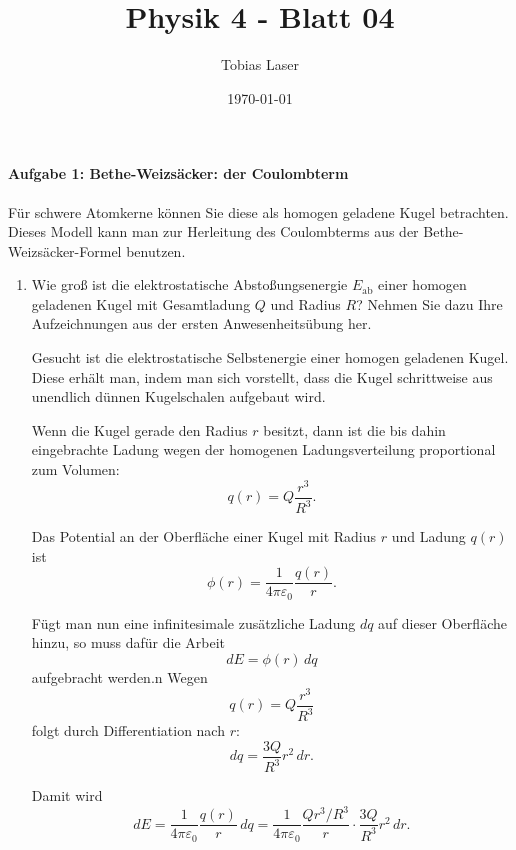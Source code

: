 \documentclass[11pt,a4paper]{scrartcl}
\begin{document}
\title{Physik 4 - Blatt 04}
\author{Tobias Laser}
\date{\today}
\maketitle
\vfill
\thispagestyle{empty}


\paragraph{Aufgabe 1: Bethe-Weizsäcker: der Coulombterm}

Für schwere Atomkerne können Sie diese als homogen geladene Kugel betrachten.
Dieses Modell kann man zur Herleitung des Coulombterms aus der Bethe-Weizsäcker-Formel benutzen.

\begin{enumerate}[label=(\alph*)]

    \item Wie groß ist die elektrostatische Abstoßungsenergie $E_{\mathrm{ab}}$ einer homogen geladenen Kugel mit Gesamtladung $Q$ und Radius $R$? Nehmen Sie dazu Ihre Aufzeichnungen aus der ersten Anwesenheitsübung her.

    \begin{solutionbox}
        Gesucht ist die elektrostatische Selbstenergie einer homogen geladenen Kugel.
        Diese erhält man, indem man sich vorstellt, dass die Kugel schrittweise aus unendlich dünnen Kugelschalen aufgebaut wird.

        Wenn die Kugel gerade den Radius $r$ besitzt, dann ist die bis dahin eingebrachte Ladung wegen der homogenen Ladungsverteilung proportional zum Volumen:
        \[
            q(r)=Q\frac{r^3}{R^3}.
        \]

        Das Potential an der Oberfläche einer Kugel mit Radius $r$ und Ladung $q(r)$ ist
        \[
            \phi(r)=\frac{1}{4\pi\varepsilon_0}\frac{q(r)}{r}.
        \]

        Fügt man nun eine infinitesimale zusätzliche Ladung $dq$ auf dieser Oberfläche hinzu, so muss dafür die Arbeit
        \[
            dE=\phi(r)\,dq 
        \]
        aufgebracht werden.n
        Wegen
        \[
            q(r)=Q\frac{r^3}{R^3}
        \]
        folgt durch Differentiation nach $r$:
        \[
            dq=\frac{3Q}{R^3}r^2\,dr.
        \]

        Damit wird
        \[
            dE
            =\frac{1}{4\pi\varepsilon_0}\frac{q(r)}{r}\,dq
            =\frac{1}{4\pi\varepsilon_0}\frac{Q r^3/R^3}{r}\cdot \frac{3Q}{R^3}r^2\,dr.
        \]


\end{solutionbox}
\end{enumerate}
\end{document}
